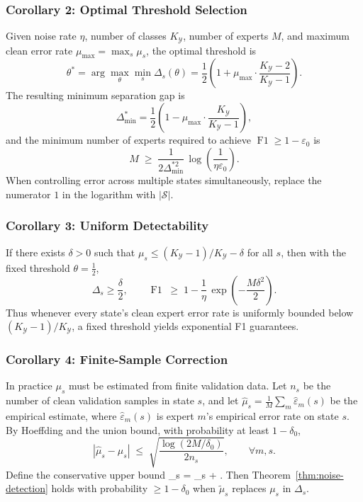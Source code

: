 \subsubsection*{Corollary 2: Optimal Threshold Selection}
Given noise rate $\eta$, number of classes $K_{\mathcal{Y}}$, number of experts
$M$, and maximum clean error rate $\mu_{\max} = \max_s \mu_s$, the optimal
threshold is
\begin{equation}
\theta^* = \arg\max_{\theta} \min_s \Delta_s(\theta)
= \frac12\!\left(1 + \mu_{\max}\cdot\frac{K_{\mathcal{Y}}-2}{K_{\mathcal{Y}}-1}\right).
\label{eq:optimal-threshold}
\end{equation}
The resulting minimum separation gap is
\[
\Delta_{\min}^* = \frac12\!\left(1 - \mu_{\max}\cdot\frac{K_{\mathcal{Y}}}{K_{\mathcal{Y}}-1}\right),
\]
and the minimum number of experts required to achieve
$\operatorname{F1} \geq 1 - \varepsilon_0$ is
\begin{equation}
M \;\geq\; \frac{1}{2\Delta_{\min}^{*2}}\,
\log\!\left(\frac{1}{\eta\varepsilon_0}\right).
\label{eq:min-experts}
\end{equation}
When controlling error across multiple states simultaneously, replace the
numerator $1$ in the logarithm with $|\mathcal{S}|$.

\subsubsection*{Corollary 3: Uniform Detectability}
If there exists $\delta > 0$ such that
$\mu_s \leq (K_{\mathcal{Y}}-1)/K_{\mathcal{Y}} - \delta$ for all $s$, then
with the fixed threshold $\theta = \tfrac12$,
\[
\Delta_s \geq \frac{\delta}{2},\qquad
\operatorname{F1} \;\geq\; 1 - \frac{1}{\eta}\,
\exp\!\left(-\frac{M\delta^2}{2}\right).
\]
Thus whenever every state's clean expert error rate is uniformly bounded
below $(K_{\mathcal{Y}}-1)/K_{\mathcal{Y}}$, a fixed threshold yields
exponential F1 guarantees.

\subsubsection*{Corollary 4: Finite-Sample Correction}
In practice $\mu_s$ must be estimated from finite validation data. Let
$n_s$ be the number of clean validation samples in state $s$, and let
$\hat{\mu}_s = \frac{1}{M}\sum_m \hat{\varepsilon}_m(s)$ be the empirical
estimate, where $\hat{\varepsilon}_m(s)$ is expert $m$'s empirical error
rate on state $s$. By Hoeffding and the union bound, with probability at
least $1 - \delta_0$,
\[
|\hat{\mu}_s - \mu_s| \;\leq\; \sqrt{\frac{\log(2M/\delta_0)}{2n_s}},
\qquad \forall m, s.
\]
Define the conservative upper bound
\tilde{\mu}_s = \hat{\mu}_s + .
Then Theorem~\ref{thm:noise-detection} holds with probability
$\geq 1 - \delta_0$ when $\tilde{\mu}_s$ replaces $\mu_s$ in
$\Delta_s$.

